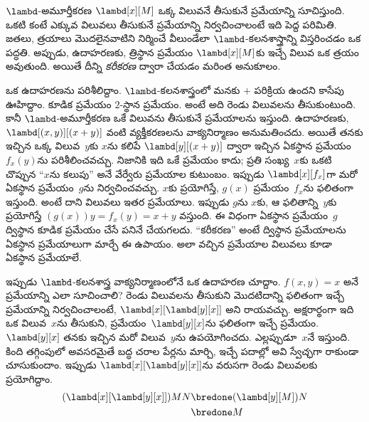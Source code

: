 \documentclass[../../../include/open-logic-section]{subfiles}
\begin{document}

$\lambd$-అమూర్తీకరణ $\lambd[x][M]$ ఒక్క విలువనే తీసుకునే ప్రమేయాన్ని
సూచిస్తుంది. ఒకటి కంటే ఎక్కువ విలువలు తీసుకునే ప్రమేయాన్ని
నిర్వచించాలంటే ఇది పెద్ద పరిమితి. జతలు, త్రయాలు మొదలైనవాటిని
నిర్మించే వీలుండేలా $\lambd$-కలనశాస్త్రాన్ని విస్తరించడం ఒక పద్ధతి.
అప్పుడు, ఉదాహరణకు, త్రిస్థాన ప్రమేయం $\lambd[x][M]$కు ఇచ్చే విలువ
ఒక త్రయం అవుతుంది.
అయితే దీన్ని \emph{కరీకరణ} ద్వారా చేయడం మరింత అనుకూలం.

ఒక ఉదాహరణను పరిశీలిద్దాం. $\lambd$-కలనశాస్త్రంలో మనకు $+$ పరిక్రియ
ఉందని కాసేపు ఊహిద్దాం. కూడిక ప్రమేయం $2$-స్థాన ప్రమేయం. అంటే అది రెండు
విలువలను తీసుకుంటుంది. కానీ $\lambd$-అమూర్తీకరణ ఒకే విలువను
తీసుకునే ప్రమేయాలను ఇస్తుంది. ఉదాహరణకు, $\lambd[(x,y)][(x+y)]$
వంటి వ్యక్తీకరణలను వాక్యనిర్మాణం అనుమతించదు. అయితే తనకు ఇచ్చిన ఒక్క విలువ~$y$కు $x$ను కలిపే $\lambd[y][(x+y)]$ ద్వారా ఇచ్చిన
ఏకస్థాన ప్రమేయం~$f_x(y)$ను పరిశీలించవచ్చు. నిజానికి ఇది ఒకే ప్రమేయం
కాదు; ప్రతి సంఖ్య~$x$కు ఒకటి చొప్పున ``$x$ను కలుపు'' అనే వేర్వేరు
ప్రమేయాల కుటుంబం. ఇప్పుడు $\lambd[x][f_x]$గా మరో ఏకస్థాన
ప్రమేయం~$g$ను నిర్వచించవచ్చు. $x$కు ప్రయోగిస్తే,
$g(x)$ ప్రమేయం~$f_x$ను ఫలితంగా ఇస్తుంది. అంటే దాని విలువలు ఇతర
ప్రమేయాలు. ఇప్పుడు $g$ను $x$కు, ఆ ఫలితాన్ని~$y$కు ప్రయోగిస్తే
$(g(x))y = f_x(y) = x+y$ వస్తుంది. ఈ విధంగా ఏకస్థాన ప్రమేయం~$g$
ద్విస్థాన కూడిక ప్రమేయం చేసే పనినే చేయగలదు. ``కరీకరణ'' అంటే
ద్విస్థాన ప్రమేయాలను ఏకస్థాన ప్రమేయాలుగా మార్చే ఈ ఉపాయం.
అలా వచ్చిన ప్రమేయాల విలువలు కూడా ఏకస్థాన ప్రమేయాలే.

ఇప్పుడు $\lambd$-కలనశాస్త్ర వాక్యనిర్మాణంలోనే ఒక ఉదాహరణ చూద్దాం.
$f(x,y) = x$ అనే ప్రమేయాన్ని ఎలా సూచించాలి? రెండు విలువలను
తీసుకుని మొదటిదాన్ని ఫలితంగా ఇచ్చే ప్రమేయాన్ని నిర్వచించాలంటే,
$\lambd[x][\lambd[y][x]]$ అని రాయవచ్చు. అక్షరార్థంగా ఇది ఒక
విలువ~$x$ను తీసుకుని, ప్రమేయం~$\lambd[y][x]$ను ఫలితంగా ఇచ్చే
ప్రమేయం. $\lambd[y][x]$ తనకు ఇచ్చిన మరో విలువ~$y$ను ఉపయోగించదు. ఎల్లప్పుడూ~$x$నే ఇస్తుంది. కింది తగ్గింపులో అవసరమైతే బద్ధ చరాల
పేర్లను మార్చి, ఇచ్చే పదాల్లో అవి స్వేచ్ఛగా రాకుండా చూసుకుందాం.
ఇప్పుడు $\lambd[x][\lambd[y][x]]$ను వరుసగా రెండు విలువలకు ప్రయోగిద్దాం.
\begin{align*}
  (\lambd[x][\lambd[y][x]])MN
  \bredone & (\lambd[y][M])N \\
  \bredone & M
\end{align*}
\end{document}
